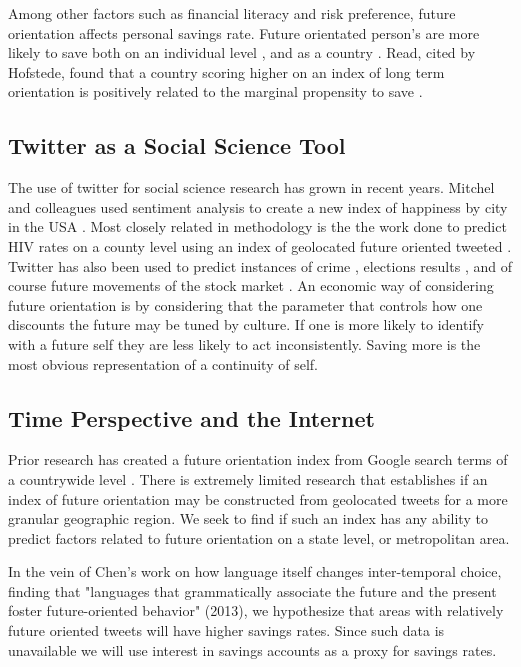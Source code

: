 \documentclass{article}
\begin{document}
Among other factors such as financial literacy and risk preference, future orientation affects personal savings rate. Future orientated person's are more likely to save both on an individual level \citep{jacobs2005influence}, and as a country \citep{hofstede1988confucius, hofstede1991cultures}. Read, cited by Hofstede, found that a country scoring higher on an index of long term orientation is positively related to the marginal propensity to save \cite{read1993politics}.

\subsection{Twitter as a Social Science Tool}

The use of twitter for social science research has grown in recent years. Mitchel and colleagues used sentiment analysis to create a new index of happiness by city in the USA \citep{mitchell2013geography}. Most closely related in methodology is the the work done to predict HIV rates on a county level using an index of geolocated future oriented tweeted \citep{ireland2015future}. Twitter has also been used to predict instances of crime \citep{gerber2014predicting}, elections results \citep{tumasjan2011election}, and of course future movements of the stock market \citep{bollen2011twitter}. An economic way of considering future orientation is by considering that the parameter that controls how one discounts the future may be tuned by culture. If one is more likely to identify with a future self they are less likely to act inconsistently. Saving more is the most obvious representation of a continuity of self.   


\subsection{Time Perspective and the Internet}

Prior research has created a future orientation index from Google search terms of a countrywide level \citep{preis2012quantifying}. There is extremely limited research that establishes if an index of future orientation may be constructed from geolocated tweets for a more granular geographic region. We seek to find if such an index has any ability to predict factors related to future orientation on a state level, or metropolitan area.

In the vein of Chen's work on how language itself changes inter-temporal choice, finding that "languages that grammatically associate the future and the present foster future-oriented behavior" (2013), we hypothesize that areas with relatively future oriented tweets will have higher savings rates. Since such data is unavailable we will use interest in savings accounts as a proxy for savings rates. 
\end{document}
